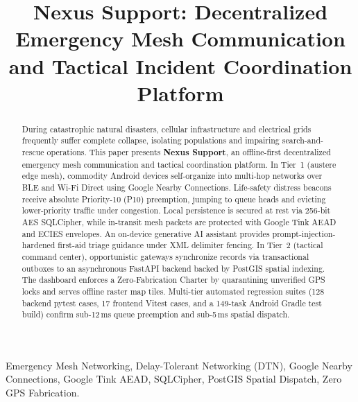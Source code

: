 \documentclass[conference,a4paper]{IEEEtran}
\begin{document}
\title{Nexus Support: Decentralized Emergency Mesh Communication and Tactical Incident Coordination Platform}

\author{
}

\maketitle

\begin{abstract}
During catastrophic natural disasters, cellular infrastructure and electrical grids frequently suffer complete collapse, isolating populations and impairing search-and-rescue operations. This paper presents \textbf{Nexus Support}, an offline-first decentralized emergency mesh communication and tactical coordination platform. In Tier~1 (austere edge mesh), commodity Android devices self-organize into multi-hop networks over BLE and Wi-Fi Direct using Google Nearby Connections. Life-safety distress beacons receive absolute Priority-10 (P10) preemption, jumping to queue heads and evicting lower-priority traffic under congestion. Local persistence is secured at rest via 256-bit AES SQLCipher, while in-transit mesh packets are protected with Google Tink AEAD and ECIES envelopes. An on-device generative AI assistant provides prompt-injection-hardened first-aid triage guidance under XML delimiter fencing. In Tier~2 (tactical command center), opportunistic gateways synchronize records via transactional outboxes to an asynchronous FastAPI backend backed by PostGIS spatial indexing. The dashboard enforces a Zero-Fabrication Charter by quarantining unverified GPS locks and serves offline raster map tiles. Multi-tier automated regression suites (128 backend pytest cases, 17 frontend Vitest cases, and a 149-task Android Gradle test build) confirm sub-12\,ms queue preemption and sub-5\,ms spatial dispatch.
\end{abstract}

\begin{IEEEkeywords}
Emergency Mesh Networking, Delay-Tolerant Networking (DTN), Google Nearby Connections, Google Tink AEAD, SQLCipher, PostGIS Spatial Dispatch, Zero GPS Fabrication.
\end{IEEEkeywords}
\end{document}
